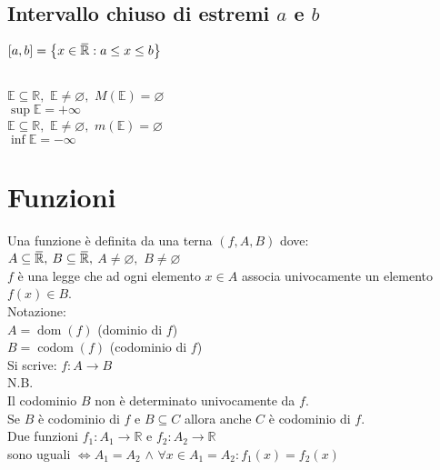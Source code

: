 \documentclass[a4paper, twoside, italian, 11pt]{book}
\newcommand{\braces}[1] {\left \{ #1 \right \}}
\newcommand{\overbar}[1] {\mkern 1.5mu\overline{\mkern-1.5mu#1\mkern-1.5mu}\mkern 1.5mu}
\DeclareMathOperator{\dom}{dom}
\DeclareMathOperator{\codom}{codom}
\newcommand{\R}{\mathbb{R}}
\newcommand{\E}{\mathbb{E}}
\let\emptyset\varnothing
\begin{document}
\subsection{Intervallo chiuso di estremi $a$ e $b$}

\noindent
$[a, b] = \braces{ x \in \overbar\R : a \leq x \leq b}$ \\


\subsection{}

\noindent
$\E \subseteq \R,$ $\E \neq \emptyset,$ $M(\E) = \emptyset$ \\
$\sup \E = +\infty$ \\

\noindent
$\E \subseteq \R,$ $\E \neq \emptyset,$ $m(\E) = \emptyset$ \\
$\inf \E = -\infty$



\section{Funzioni}

\noindent
Una funzione è definita da una terna $(f, A, B)$ dove: \\

\noindent
$A \subseteq \overbar\R,$ $B \subseteq \overbar\R,$ $A \neq \emptyset,$ $B \neq \emptyset$ \\
$f$ è una legge che ad ogni elemento $x \in A$ associa univocamente un elemento $f(x) \in B$. \\

\noindent
Notazione: \\
$A = \dom(f)$ (dominio di $f$) \\
$B = \codom(f)$ (codominio di $f$) \\

\noindent
Si scrive: $f : A \rightarrow B$ \\

\noindent
N.B. \\
Il codominio $B$ non è determinato univocamente da $f$. \\
Se $B$ è codominio di $f$ e $B \subseteq C$ allora anche $C$ è codominio di $f$. \\

\noindent
Due funzioni $f_1 : A_1 \rightarrow \R$ e $f_2 : A_2 \rightarrow \R$ \\
sono uguali $\iff A_1 = A_2$ $\land$ $\forall x \in A_1 = A_2 : f_1(x) = f_2(x)$
\end{document}
